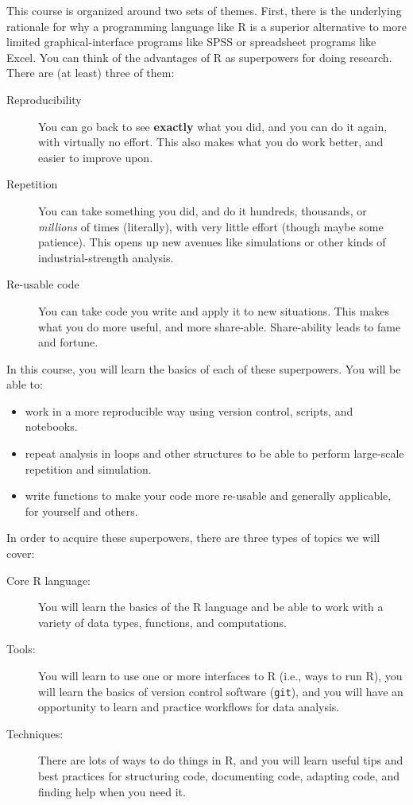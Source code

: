 \documentclass{tufte-handout}
\begin{document}
This course is organized around two sets of themes. First, there is the underlying rationale for why a programming language like R is a superior alternative to more limited graphical-interface programs like SPSS or spreadsheet programs like Excel.  You can think of the advantages of R as superpowers for doing research.  There are (at least) three of them:

\begin{description}
\item[Reproducibility] You can go back to see \textbf{exactly} what you did, and you can do it again, with virtually no effort.  This also makes what you do work better, and easier to improve upon.
\item[Repetition] You can take something you did, and do it hundreds, thousands, or \emph{millions} of times (literally), with very little effort (though maybe some patience). This opens up new avenues like simulations or other kinds of industrial-strength analysis.
\item[Re-usable code] You can take code you write and apply it to new situations. This makes what you do more useful, and more share-able.  Share-ability leads to fame and fortune.
\end{description}

In this course, you will learn the basics of each of these superpowers.  You will be able to:
\begin{itemize}
\item work in a more reproducible way using version control, scripts, and notebooks.
\item repeat analysis in loops and other structures to be able to perform large-scale repetition and simulation.
\item write functions to make your code more re-usable and generally applicable, for yourself and others.
\end{itemize}

In order to acquire these superpowers, there are three types of topics we will cover:
\begin{description}
\item[Core R language:] You will learn the basics of the R language and be able to work with a variety of data types, functions, and computations.
\item[Tools:] You will learn to use one or more interfaces to R (i.e., ways to run R), you will learn the basics of version control software (\texttt{git}), and you will have an opportunity to learn and practice workflows for data analysis.
\item[Techniques:] There are lots of ways to do things in R, and you will learn useful tips and best practices for structuring code, documenting code, adapting code, and finding help when you need it.
\end{description}
\end{document}
